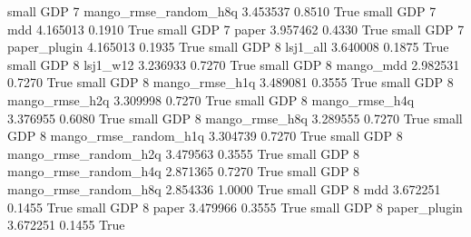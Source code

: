      small      GDP                 7 mango_rmse_random_h8q   3.453537      0.8510    True
     small      GDP                 7                   mdd   4.165013      0.1910    True
     small      GDP                 7                 paper   3.957462      0.4330    True
     small      GDP                 7          paper_plugin   4.165013      0.1935    True
     small      GDP                 8              lsj1_all   3.640008      0.1875    True
     small      GDP                 8              lsj1_w12   3.236933      0.7270    True
     small      GDP                 8             mango_mdd   2.982531      0.7270    True
     small      GDP                 8        mango_rmse_h1q   3.489081      0.3555    True
     small      GDP                 8        mango_rmse_h2q   3.309998      0.7270    True
     small      GDP                 8        mango_rmse_h4q   3.376955      0.6080    True
     small      GDP                 8        mango_rmse_h8q   3.289555      0.7270    True
     small      GDP                 8 mango_rmse_random_h1q   3.304739      0.7270    True
     small      GDP                 8 mango_rmse_random_h2q   3.479563      0.3555    True
     small      GDP                 8 mango_rmse_random_h4q   2.871365      0.7270    True
     small      GDP                 8 mango_rmse_random_h8q   2.854336      1.0000    True
     small      GDP                 8                   mdd   3.672251      0.1455    True
     small      GDP                 8                 paper   3.479966      0.3555    True
     small      GDP                 8          paper_plugin   3.672251      0.1455    True